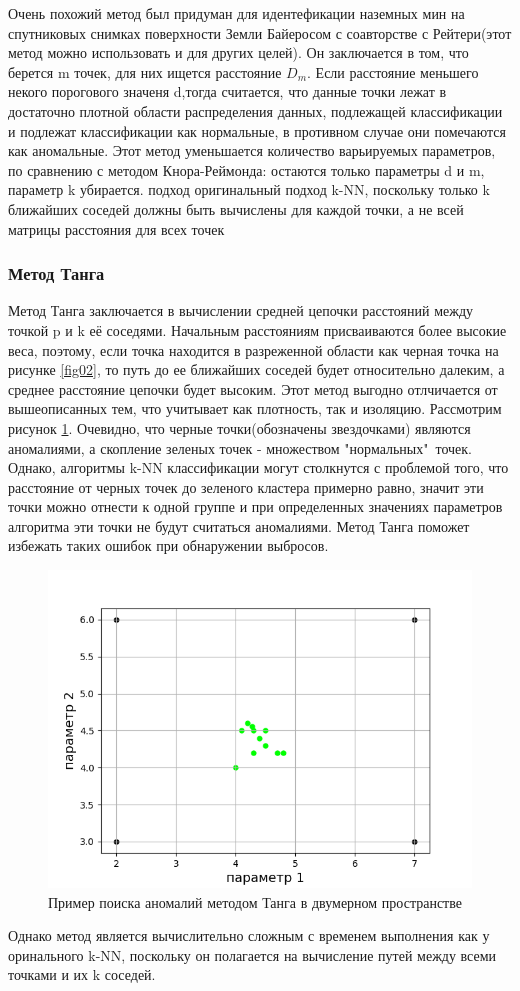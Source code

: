   Очень похожий метод был придуман для идентефикации  наземных мин  на спутниковых снимках поверхности Земли Байеросом с соавторстве с Рейтери\cite{Book10}(этот метод можно использовать и для других целей). Он заключается в том, что берется m точек, для них ищется расстояние $D_m$. Если расстояние меньшего некого порогового значеня d,тогда  считается, что  данные точки лежат в достаточно плотной области распределения данных, подлежащей классификации и подлежат классификации как нормальные, в противном случае они помечаются как аномальные. Этот метод уменьшается количество варьируемых параметров, по сравнению с методом Кнора-Реймонда: остаются только параметры d и m, параметр k убирается. 
  подход оригинальный подход k-NN, поскольку только k ближайших соседей должны быть вычислены для каждой точки, а не всей матрицы расстояния
  для всех точек
\subsubsection{Метод Танга}
Метод Танга заключается  в вычислении средней цепочки расстояний между точкой p и k её соседями. Начальным расстояниям присваиваются более высокие веса, поэтому, если точка находится в разреженной
области как черная точка на рисунке \ref{fig02}, то путь до  ее ближайших соседей  будет относительно далеким, а среднее расстояние цепочки
будет высоким. Этот метод выгодно отлчичается от вышеописанных тем, что учитывает как  плотность, так и изоляцию. Рассмотрим рисунок \ref{fig03}.
Очевидно, что черные точки(обозначены звездочками) являются аномалиями, а скопление зеленых точек - множеством "нормальных"\ точек. Однако, алгоритмы k-NN классификации могут столкнутся с проблемой того, что расстояние от черных точек до зеленого кластера примерно равно, значит эти точки можно отнести к одной группе и при определенных значениях параметров алгоритма эти точки не будут считаться аномалиями. Метод Танга поможет избежать таких ошибок при обнаружении выбросов.
\begin{figure}
	\centering
	\includegraphics[width=.5\textwidth]{img/3.png}
	\caption{Пример поиска аномалий методом Танга в двумерном пространстве}
	\label{fig03}
\end{figure}
 Однако метод является вычислительно сложным с временем выполнения как у оринального k-NN, поскольку он полагается на вычисление путей между всеми точками и их k соседей.
